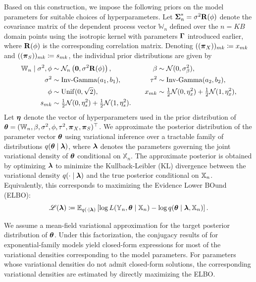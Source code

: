 \documentclass[numsec,webpdf,modern,medium,namedate]{oup-authoring-template}
\theoremstyle{thmstyleone}%
\theoremstyle{thmstyletwo}%
\theoremstyle{thmstylethree}%
\begin{document}
Based on this construction, we impose the following priors on the model parameters for suitable choices of hyperparameters. Let $\boldsymbol{\Sigma}^\ast_n = \sigma^2\mathbf{R}(\phi)$ denote the covariance matrix of the dependent process vector $\mathbb{W}_n$ defined over the $n=KB$ domain points using the isotropic kernel with parameters $\boldsymbol{\Gamma}$ introduced earlier, where $\mathbf{R}(\phi)$ is the corresponding correlation matrix. Denoting $((\boldsymbol{\pi}_X))_{mk} \coloneq x_{mk}$ and $((\boldsymbol{\pi}_S))_{mk} \coloneq s_{mk}$, the individual prior distributions are given by
{\small
\begin{align*}
    \mathbb{W}_n\mid\sigma^2,\phi &\sim \mathcal{N}_n\left(\boldsymbol{0},\sigma^2\mathbf{R}(\phi)\right), &
    \beta &\sim \mathcal{N}(0,\sigma^2_\beta),\\
    \sigma^2 &\sim \mathrm{Inv\text{-}Gamma}(a_1,b_1), &
    \tau^2 &\sim \mathrm{Inv\text{-}Gamma}(a_2,b_2),\\
    \phi &\sim \mathrm{Unif}(0,\sqrt{2}), & \quad
    x_{mk} &\sim \tfrac{1}{2}\mathcal{N}(0,\eta^2_x)+\tfrac{1}{2}\mathcal{N}(1,\eta^2_x),\\
    s_{mk} &\sim \tfrac{1}{2}\mathcal{N}(0,\eta^2_s)+\tfrac{1}{2}\mathcal{N}(1,\eta^2_s).
\end{align*}}
Let $\boldsymbol{\eta}$ denote the vector of hyperparameters used in the prior distribution of $\boldsymbol{\theta} = (\mathbb{W}_n,\beta,\sigma^2,\phi,\tau^2,\boldsymbol{\pi}_X,\boldsymbol{\pi}_S)^\top$. We approximate the posterior distribution of the parameter vector $\boldsymbol{\theta}$ using variational inference over a tractable family of distributions $q(\boldsymbol{\theta} \mid \boldsymbol{\lambda})$, where $\boldsymbol{\lambda}$ denotes the parameters governing the joint variational density of $\boldsymbol{\theta}$ conditional on $\mathbb{X}_n$. The approximate posterior is obtained by optimizing $\boldsymbol{\lambda}$ to minimize the Kullback-Leibler (KL) divergence between the variational density $q(\cdot \mid \boldsymbol{\lambda})$ and the true posterior conditional on $\mathbb{X}_n$. Equivalently, this corresponds to maximizing the Evidence Lower BOund (ELBO):
\begin{equation}\label{eq:elbo-def}
    \mathscr{L}(\boldsymbol{\lambda}) \coloneq \mathbb{E}_{q(\cdot\mid\boldsymbol{\lambda})}\left[\log L(\mathbb{Y}_n,\boldsymbol{\theta}\mid\mathbb{X}_n) - \log q(\boldsymbol{\theta}\mid\boldsymbol{\lambda},\mathbb{X}_n)\right].
\end{equation}

We assume a mean-field variational approximation for the target posterior distribution of $\boldsymbol{\theta}$. Under this factorization, the conjugacy results of \cite{ren2011variational} for exponential-family models yield closed-form expressions for most of the variational densities corresponding to the model parameters. For parameters whose variational densities do not admit closed-form solutions, the corresponding variational densities are estimated by directly maximizing the ELBO.
\end{document}

